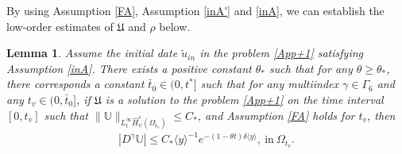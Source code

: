 \documentclass{amsart}
\numberwithin{equation}{section}
\newtheorem{lemma}{Lemma}[section]
\newcommand\y{{{\langle y \rangle}}}
\begin{document}
By using Assumption \ref{FA},  Assumption \ref{inA'} and \ref{inA}, we can establish the low-order estimates of $\mathfrak{U}$ and $\rho$ below.
\begin{lemma}\label{DI}
Assume the initial date $\tilde{u}_{in}$ in the problem \eqref{App+1} satisfying Assumption \ref{inA}.
There exists a positive constant $\theta_{*}$ such that for any $\theta\geq\theta_{*}$, there corresponds a constant $\bar{t}_{0}\in(0,t^{*}]$ such that for any multiindex $\gamma\in\Gamma_{6}$ and any $t_{v}\in(0,\bar{t}_{0}]$,
if $\mathfrak{U}$ is a solution to the problem \eqref{App+1} on the time interval $[0,t_{v}]$ such that
$\|\mathbb{U}\|_{L_{t}^{\infty}\hat{H}_{\psi}^{s}(\Omega_{t_{v}})}\leq C_{*}$,
and Assumption \ref{FA} holds for $t_{v}$, then
\begin{align}\label{Di}
|D^{\gamma}\mathbb{U}|\leq C_{*}\y^{-1}e^{-(1-\theta t)\delta\y}, ~\text{in}~\Omega_{t_{v}}.
\end{align}
\end{lemma}
\end{document}
